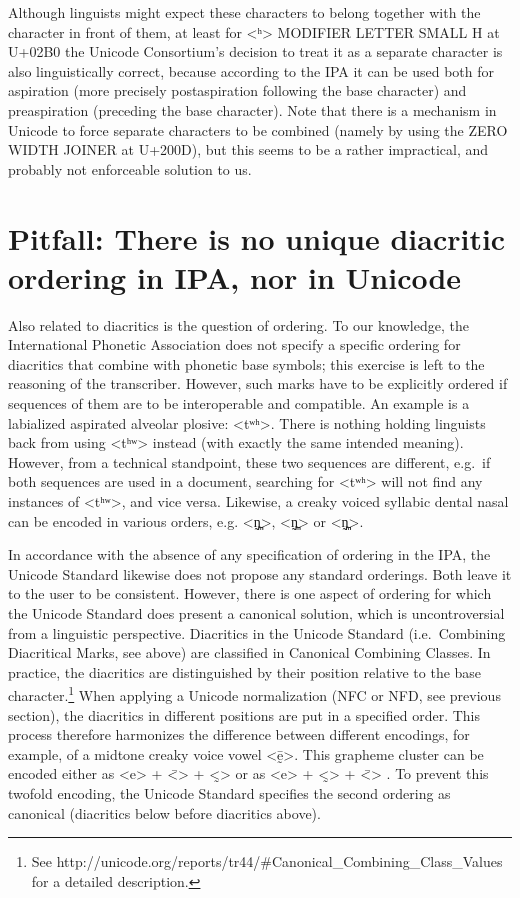 Although linguists might expect these characters to belong together with the character in front of them, at least for <ʰ> MODIFIER LETTER SMALL H at U+02B0 the Unicode Consortium's decision to treat it as a separate character is also linguistically correct, because according to the IPA it can be used both for aspiration (more precisely postaspiration following the base character) and preaspiration (preceding the base character). Note that there is a mechanism in Unicode to force separate characters to be combined (namely by using the ZERO WIDTH JOINER at U+200D), but this seems to be a rather impractical, and probably not enforceable solution to us.

\section{Pitfall: There is no unique diacritic ordering in IPA, nor in Unicode}
\label{pitfall-neither-the-ipa-nor-the-unicode-standard-enforce-a-unique-diacritic-ordering}

Also related to diacritics is the question of ordering. To our knowledge, the International Phonetic Association does not specify a specific ordering for diacritics that combine with phonetic base symbols; this exercise is left to the reasoning of the transcriber. However, such marks have to be explicitly ordered if sequences of them are to be interoperable and compatible. An example is a labialized aspirated alveolar plosive: <tʷʰ>. There is nothing holding linguists back from using <tʰʷ> instead (with exactly the same intended meaning). However, from a technical standpoint, these two sequences are different, e.g.~if both sequences are used in a document, searching for <tʷʰ> will not find any instances of <tʰʷ>, and vice versa. Likewise, a creaky voiced syllabic dental nasal can be encoded in various orders, e.g. <n̪̰̩>, <n̩̰̪> or <n̩̪̰>.

In accordance with the absence of any specification of ordering in the IPA, the Unicode Standard likewise does not propose any standard orderings. Both leave it to the user to be consistent. However, there is one aspect of ordering for which the Unicode Standard does present a canonical solution, which is uncontroversial from a linguistic perspective. Diacritics in the Unicode Standard (i.e.~Combining Diacritical Marks, see above) are classified in Canonical Combining Classes. In practice, the diacritics are distinguished by their position relative to the base character.\footnote{See http://unicode.org/reports/tr44/\#Canonical\_Combining\_Class\_Values for a detailed description.} When applying a Unicode normalization (NFC or NFD, see previous section), the diacritics in different positions are put in a specified order. This process therefore harmonizes the difference between different encodings, for example, of a midtone creaky voice vowel <ḛ̄>. This grapheme cluster can be encoded either as <e> + <̄> + <̰> or as <e> + <̰> + <̄> . To prevent this twofold encoding, the Unicode Standard specifies the second ordering as canonical (diacritics below before diacritics above).

